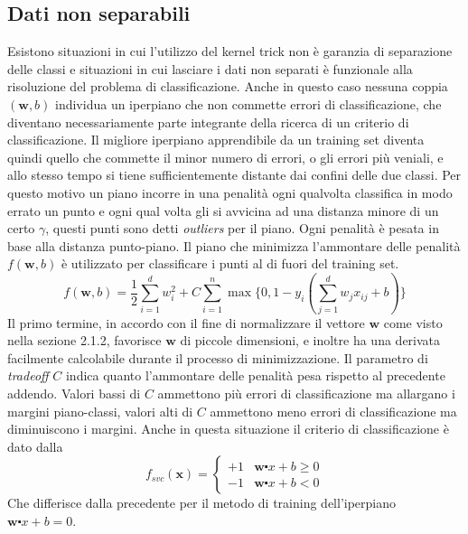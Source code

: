 \documentclass [10pt,a4paper,twoside,openright] {book}
\begin{document}
\subsection{Dati non separabili}
Esistono situazioni in cui l'utilizzo del kernel trick non è garanzia di separazione delle classi e situazioni in cui lasciare i dati non separati è funzionale alla risoluzione del problema di classificazione. Anche in questo caso nessuna coppia $(\mathbf{w}, b)$ individua un iperpiano che non commette errori di classificazione, che diventano necessariamente parte integrante della ricerca di un criterio di classificazione. Il migliore iperpiano apprendibile da un training set diventa quindi quello che commette il minor numero di errori, o gli errori più veniali, e allo stesso tempo si tiene sufficientemente distante dai confini delle due classi. Per questo motivo un piano incorre in una penalità ogni qualvolta classifica in modo errato un punto e ogni qual volta gli si avvicina ad una distanza minore di un certo $\gamma$, questi punti sono detti \textit{outliers} per il piano. Ogni penalità è pesata in base alla distanza punto-piano. Il piano che minimizza l'ammontare delle penalità $f(\mathbf{w}, b)$ è utilizzato per classificare i punti al di fuori del training set.
\[
f(\mathbf{w},b) = \dfrac{1}{2} \sum\limits_{i=1}^{d}w_i^2 + C\sum\limits_{i=1}^n \max \lbrace 0, 1-y_i(\sum\limits_{j=1}^d w_jx_{ij} + b) \rbrace 
\]
Il primo termine, in accordo con il fine di normalizzare il vettore $\mathbf{w}$ come visto nella sezione 2.1.2, favorisce $\mathbf{w}$ di piccole dimensioni, e inoltre ha una derivata facilmente calcolabile durante il processo di minimizzazione. Il parametro di \textit{tradeoff} $C$ indica quanto l'ammontare delle penalità pesa rispetto al precedente addendo. Valori bassi di $C$ ammettono più errori di classificazione ma allargano i margini piano-classi, valori alti di $C$ ammettono meno errori di classificazione ma diminuiscono i margini.
Anche in questa situazione il criterio di classificazione è dato dalla
\[
f_{svc}(\mathbf{x}) = 
\begin{cases}
+1 & \mathbf{w} \centerdot x + b \geq 0 \\
-1 & \mathbf{w} \centerdot x + b < 0
\end{cases}
\] 
Che differisce dalla precedente per il metodo di training dell'iperpiano $\mathbf{w} \centerdot x + b = 0$.
\end{document}

